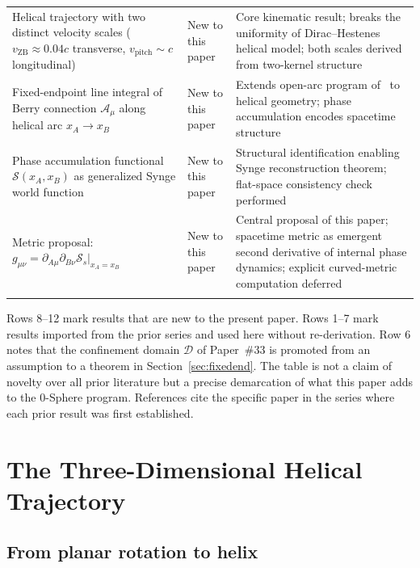 \documentclass[%
 reprint, amsmath,amssymb, aps, prb, ]{revtex4-2}
\numberwithin{equation}{section}
\begin{document}
\begin{table}[t!]
\begin{tabular}{p{7.0cm}p{3.5cm}p{6.5cm}}
\addlinespace[0.3cm]
Helical trajectory with two distinct velocity scales ($v_\mathrm{ZB}\approx 0.04c$ transverse, $v_\mathrm{pitch}\sim c$ longitudinal)
& New to this paper
& Core kinematic result; breaks the uniformity of Dirac--Hestenes helical model; both scales derived from two-kernel structure \\
\addlinespace[0.3cm]
Fixed-endpoint line integral of Berry connection $\mathcal{A}_\mu$ along helical arc $x_A\to x_B$
& New to this paper
& Extends open-arc program of~\cite{hanamura29} to helical geometry; phase accumulation encodes spacetime structure \\
\addlinespace[0.3cm]
Phase accumulation functional $\mathcal{S}(x_A,x_B)$ as generalized Synge world function
& New to this paper
& Structural identification enabling Synge reconstruction theorem; flat-space consistency check performed \\
\addlinespace[0.3cm]
Metric proposal: $g_{\mu\nu} = \partial_{A\mu}\partial_{B\nu}\mathcal{S}_s\big|_{x_A=x_B}$
& New to this paper
& Central proposal of this paper; spacetime metric as emergent second derivative of internal phase dynamics; explicit curved-metric computation deferred \\
\addlinespace[0.2cm]
\bottomrule
\end{tabular}
\vspace{0.2cm}
\begin{minipage}{0.95\textwidth}
\justifying\footnotesize
Rows 8--12 mark results that are new to the present paper. Rows 1--7 mark results imported from the prior series and used here without re-derivation. Row 6 notes that the confinement domain $\mathcal{D}$ of Paper~\#33 is promoted from an assumption to a theorem in Section~\ref{sec:fixedend}. The table is not a claim of novelty over all prior literature but a precise demarcation of what this paper adds to the 0-Sphere program. References cite the specific paper in the series where each prior result was first established.
\end{minipage}
\end{table}

\section{The Three-Dimensional Helical Trajectory}
\label{sec:helix}

\subsection{From planar rotation to helix}
\end{document}
